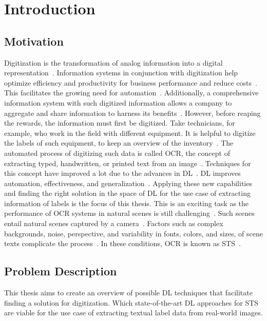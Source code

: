 \chapter{Introduction}\label{ch:intro}
\section{Motivation}
Digitization is the transformation of analog information into a digital
representation~\citep{imgrund_approaching_2018}.
Information systems in conjunction with digitization help optimize efficiency and productivity
for business performance and reduce costs~\citep{imgrund_approaching_2018}.
This facilitates the growing need for automation~\citep{imgrund_approaching_2018}.
Additionally, a comprehensive information system with such digitized information allows a company
to aggregate and share information to harness its benefits~\citep{goodhue_impact_1992}.
However, before reaping the rewards, the information must first be digitized.
Take technicians, for example, who work in the field with different equipment.
It is helpful to digitize the labels of such equipment, to keep an overview of the
inventory~\citep{abramowicz_business_2019}.
The automated process of digitizing such data is called \ac{OCR}, the concept of extracting typed,
handwritten, or printed text from an image~\citep{zhao_improving_2020}.
Techniques for this concept have improved a lot due to the advances in
\ac{DL}~\citep{zhao_improving_2020}.
\ac{DL} improves automation, effectiveness, and generalization~\citep{chen_text_2021}.
Applying these new capabilities and finding the right solution in the space of \ac{DL} for the
use case of extracting information of labels is the focus of this thesis.
This is an exciting task as the performance of \ac{OCR} systems in natural scenes is still
challenging~\citep{zhao_improving_2020, chen_text_2021}.
Such scenes entail natural scenes captured by a camera~\citep{chen_text_2021, baek_what_2019}.
Factors such as complex backgrounds, noise, perspective, and variability in fonts, colors, and sizes,
of scene texts complicate the process~\citep{hu_gtc_2020,chen_text_2021,baek_what_2019}.
In these conditions, \ac{OCR} is known as \ac{STS}~\citep{long_scene_2021}.

\section{Problem Description}\label{se:problem}
This thesis aims to create an overview of possible \ac{DL} techniques that facilitate
finding a solution for digitization.
Which state-of-the-art \ac{DL} approaches for \ac{STS} are viable for the use case of extracting
textual label data from real-world images.

